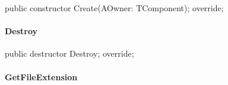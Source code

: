 \documentclass{report}
\newif\ifpdf
\begin{document}
\label{PasDoc_GenHtml.TGenericHTMLDocGenerator-Create}
\begin{list}{}{
\setlength{\itemindent}{0cm}
\setlength{\listparindent}{0cm}
\setlength{\leftmargin}{\evensidemargin}
\addtolength{\leftmargin}{\tmplength}
\settowidth{\labelsep}{X}
\addtolength{\leftmargin}{\labelsep}
\setlength{\labelwidth}{\tmplength}
}
\item[\textbf{Declaration}\hfill]
\ifpdf
\begin{flushleft}
\fi
\begin{ttfamily}
public constructor Create(AOwner: TComponent); override;\end{ttfamily}

\ifpdf
\end{flushleft}
\fi

\end{list}
\paragraph*{Destroy}\hspace*{\fill}

\label{PasDoc_GenHtml.TGenericHTMLDocGenerator-Destroy}
\begin{list}{}{
\setlength{\itemindent}{0cm}
\setlength{\listparindent}{0cm}
\setlength{\leftmargin}{\evensidemargin}
\addtolength{\leftmargin}{\tmplength}
\settowidth{\labelsep}{X}
\addtolength{\leftmargin}{\labelsep}
\setlength{\labelwidth}{\tmplength}
}
\item[\textbf{Declaration}\hfill]
\ifpdf
\begin{flushleft}
\fi
\begin{ttfamily}
public destructor Destroy; override;\end{ttfamily}

\ifpdf
\end{flushleft}
\fi

\end{list}
\paragraph*{GetFileExtension}\hspace*{\fill}
\end{document}
